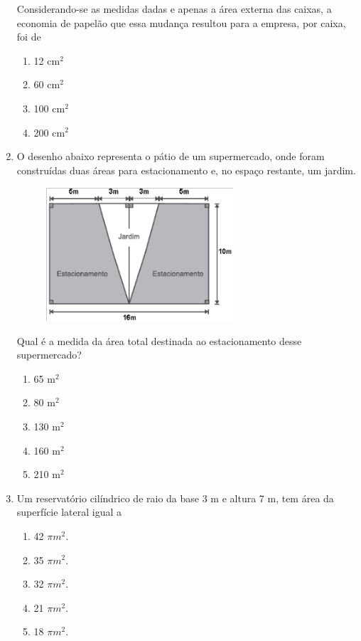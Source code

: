 \documentclass[twocolumn,oneside,a4paper,12.0pt]{article}
\begin{document}
\begin{enumerate}
Considerando-se as medidas dadas e apenas a área externa das caixas, a economia de papelão que essa mudança resultou para a empresa, por caixa, foi de
	\begin{enumerate}
	\item 12 cm$^2$
	\item 60 cm$^2$
	\item 100 cm$^2$
	\item 200 cm$^2$
	\end{enumerate}

\item O desenho abaixo representa o pátio de um supermercado, onde foram construídas duas áreas para estacionamento e, no espaço restante, um jardim.

	\begin{figure}[!htb]
	\center
	\includegraphics[width=7cm]{Extras/a3.png}
	\end{figure}

Qual é a medida da área total destinada ao estacionamento desse supermercado?

	\begin{enumerate}
	\item 65 m$^2$
	\item 80 m$^2$
	\item 130 m$^2$
	\item 160 m$^2$
	\item 210 m$^2$
	\end{enumerate}


\item Um reservatório cilíndrico de raio da base 3 m e altura 7 m, tem área da superfície lateral igual a

\begin{enumerate}
\item 42 $\pi m^2$.
\item 35 $\pi m^2$.
\item 32 $\pi m^2$.
\item 21 $\pi m^2$.
\item 18 $\pi m^2$.
\end{enumerate}


\end{enumerate}
\end{document}
